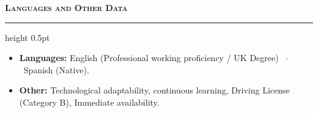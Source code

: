 \documentclass[10pt,a4paper]{article}
\newcommand{\cvsection}[1]{%
  \vspace{0.45em}%
  {\large\textbf{\textsc{#1}}}\\[-0.5em]%
  {\color{primary}\hrule height 0.5pt}%
  \vspace{0.35em}%
}
\begin{document}
\cvsection{Languages and Other Data}
\begin{itemize}[leftmargin=1.2em, itemsep=1.2pt, topsep=1.5pt]
  \item \textbf{Languages:} English (Professional working proficiency / UK Degree) \ $\cdot$ \ Spanish (Native).
  \item \textbf{Other:} Technological adaptability, continuous learning, Driving License (Category B), Immediate availability.
\end{itemize}
\end{document}
